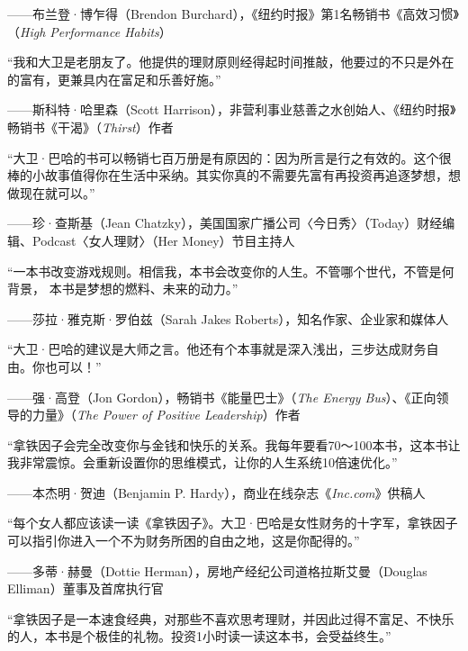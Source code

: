 {\kaishu \hfill ——布兰登·博乍得（Brendon Burchard），《纽约时报》第1名畅销书《高效习惯》（\textit{High Performance Habits}）}\vspace{1em}

“我和大卫是老朋友了。他提供的理财原则经得起时间推敲，他要过的不只是外在的富有，更兼具内在富足和乐善好施。”

{\kaishu \hfill ——斯科特·哈里森（Scott Harrison），非营利事业慈善之水创始人、《纽约时报》畅销书《干渴》（\textit{Thirst}）作者}\vspace{1em}

“大卫·巴哈的书可以畅销七百万册是有原因的：因为所言是行之有效的。这个很棒的小故事值得你在生活中采纳。其实你真的不需要先富有再投资再追逐梦想，想做现在就可以。”

{\kaishu \hfill ——珍·查斯基（Jean Chatzky），美国国家广播公司〈今日秀〉（Today）财经编辑、Podcast〈女人理财〉（Her Money）节目主持人}\vspace{1em}

“一本书改变游戏规则。相信我，本书会改变你的人生。不管哪个世代，不管是何背景， 本书是梦想的燃料、未来的动力。”

{\kaishu \hfill ——莎拉·雅克斯·罗伯兹（Sarah Jakes Roberts），知名作家、企业家和媒体人}\vspace{1em}

“大卫·巴哈的建议是大师之言。他还有个本事就是深入浅出，三步达成财务自由。你也可以！”

{\kaishu \hfill ——强·高登（Jon Gordon），畅销书《能量巴士》（\textit{The Energy Bus}）、《正向领导的力量》（\textit{The Power of Positive Leadership}）作者}\vspace{1em}

“拿铁因子会完全改变你与金钱和快乐的关系。我每年要看70～100本书，这本书让我非常震惊。会重新设置你的思维模式，让你的人生系统10倍速优化。”

{\kaishu \hfill ——本杰明·贺迪（Benjamin P. Hardy），商业在线杂志《\textit{Inc.com}》供稿人}\vspace{1em}

“每个女人都应该读一读《拿铁因子》。大卫·巴哈是女性财务的十字军，拿铁因子可以指引你进入一个不为财务所困的自由之地，这是你配得的。”

{\kaishu \hfill ——多蒂·赫曼（Dottie Herman），房地产经纪公司道格拉斯艾曼（Douglas Elliman）董事及首席执行官}\vspace{1em}

“拿铁因子是一本速食经典，对那些不喜欢思考理财，并因此过得不富足、不快乐的人，本书是个极佳的礼物。投资1小时读一读这本书，会受益终生。”

